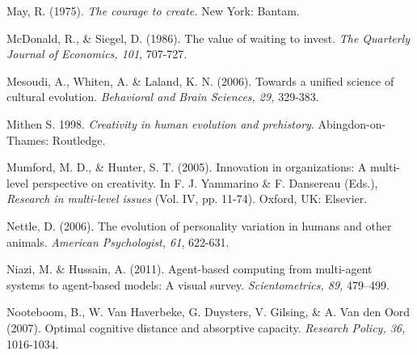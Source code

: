 \documentclass[a4paper,12pt,man,british]{apa6}
\begin{document}
\begin{description}
\item May, R. (1975). \emph{The courage to create.} New York: Bantam.


\item McDonald, R., \& Siegel, D. (1986). The value of waiting to invest. \emph{The Quarterly Journal of Economics, 101}, 707-727.

\item Mesoudi, A., Whiten, A. \& Laland, K. N. (2006). Towards a unified science of cultural evolution. \emph{Behavioral and Brain Sciences, 29,} 329-383. 

\item Mithen S. 1998. {\it Creativity in human evolution and prehistory}. Abingdon-on-Thames: Routledge.



\item Mumford, M. D., \& Hunter, S. T. (2005). Innovation in organizations: A multi-level perspective on creativity. In F. J. Yammarino \& F. Dansereau (Eds.), \emph{Research in multi-level issues} (Vol. IV, pp. 11-74). Oxford, UK: Elsevier.

\item Nettle, D. (2006). The evolution of personality variation in humans and other animals. \emph{American Psychologist, 61}, 622-631.

\item Niazi, M. \& Hussain, A. (2011). Agent-based computing from multi-agent systems to agent-based models: A visual survey. \emph{Scientometrics, 89,} 479–499.

\item Nooteboom, B., W. Van Haverbeke, G. Duysters, V. Gilsing, \& A. Van den Oord (2007). Optimal cognitive distance and absorptive capacity. \emph{Research Policy, 36,} 1016-1034.


\end{description}
\end{document}
